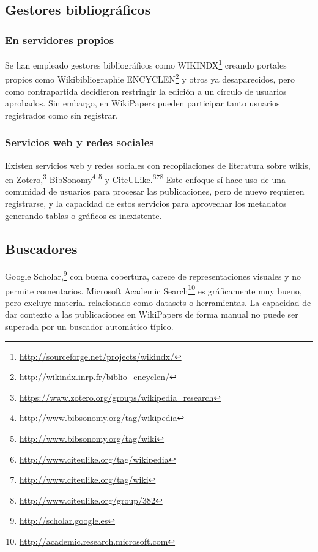 \documentclass[11pt,onecolumn]{article}
\begin{document}
\subsection{Gestores bibliográficos}

\subsubsection{En servidores propios}
Se han empleado gestores bibliográficos como WIKINDX\footnote{\href{http://sourceforge.net/projects/wikindx/}{http://sourceforge.net/projects/wikindx/}} creando portales propios como Wikibibliographie ENCYCLEN\footnote{\href{http://wikindx.inrp.fr/biblio_encyclen/}{http://wikindx.inrp.fr/biblio\_encyclen/}} y otros ya desaparecidos, pero como contrapartida decidieron restringir la edición a un círculo de usuarios aprobados. Sin embargo, en WikiPapers pueden participar tanto usuarios registrados como sin registrar.


\subsubsection{Servicios web y redes sociales}
Existen servicios web y redes sociales con recopilaciones de literatura sobre wikis, en Zotero,\footnote{\href{https://www.zotero.org/groups/wikipedia_research}{https://www.zotero.org/groups/wikipedia\_research}} BibSonomy\footnote{\href{http://www.bibsonomy.org/tag/wikipedia}{http://www.bibsonomy.org/tag/wikipedia}} \footnote{\href{http://www.bibsonomy.org/tag/wiki}{http://www.bibsonomy.org/tag/wiki}} y CiteULike.\footnote{\href{http://www.citeulike.org/tag/wikipedia}{http://www.citeulike.org/tag/wikipedia}}\footnote{\href{http://www.citeulike.org/tag/wiki}{http://www.citeulike.org/tag/wiki}}\footnote{\href{http://www.citeulike.org/group/382}{http://www.citeulike.org/group/382}} Este enfoque sí hace uso de una comunidad de usuarios para procesar las publicaciones, pero de nuevo requieren registrarse, y la capacidad de estos servicios para aprovechar los metadatos generando tablas o gráficos es inexistente.

\subsection{Buscadores}
Google Scholar,\footnote{\href{http://scholar.google.es}{http://scholar.google.es}} con buena cobertura, carece de representaciones visuales y no permite comentarios. Microsoft Academic Search\footnote{\href{http://academic.research.microsoft.com}{http://academic.research.microsoft.com}} es gráficamente muy bueno, pero excluye material relacionado como datasets o herramientas. La capacidad de dar contexto a las publicaciones en WikiPapers de forma manual no puede ser superada por un buscador
automático típico.
\end{document}
